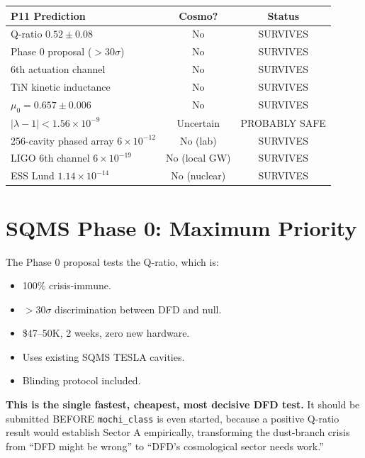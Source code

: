 \documentclass[11pt]{article}
\begin{document}
\begin{table}[h]
\centering
\begin{tabular}{lcc}
\toprule
\textbf{P11 Prediction} & \textbf{Cosmo?} & \textbf{Status} \\
\midrule
Q-ratio $0.52 \pm 0.08$ & No & SURVIVES \\
Phase 0 proposal ($>30\sigma$) & No & SURVIVES \\
6th actuation channel & No & SURVIVES \\
TiN kinetic inductance & No & SURVIVES \\
$\mu_0 = 0.657 \pm 0.006$ & No & SURVIVES \\
$|\lambda-1| < 1.56 \times 10^{-9}$ & Uncertain & PROBABLY SAFE \\
256-cavity phased array $6 \times 10^{-12}$ & No (lab) & SURVIVES \\
LIGO 6th channel $6 \times 10^{-19}$ & No (local GW) & SURVIVES \\
ESS Lund $1.14 \times 10^{-14}$ & No (nuclear) & SURVIVES \\
\bottomrule
\end{tabular}
\end{table}

\section{SQMS Phase 0: Maximum Priority}

The Phase 0 proposal tests the Q-ratio, which is:
\begin{itemize}
\item 100\% crisis-immune.
\item $>30\sigma$ discrimination between DFD and null.
\item \$47--50K, 2 weeks, zero new hardware.
\item Uses existing SQMS TESLA cavities.
\item Blinding protocol included.
\end{itemize}

\textbf{This is the single fastest, cheapest, most decisive DFD test.}
It should be submitted BEFORE \texttt{mochi\_class} is even started,
because a positive Q-ratio result would establish Sector A empirically,
transforming the dust-branch crisis from ``DFD might be wrong'' to
``DFD's cosmological sector needs work.''
\end{document}
